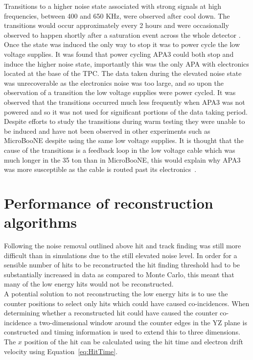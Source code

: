 Transitions to a higher noise state associated with strong signals at high frequencies, between 400 and 650 KHz, were observed after cool down. The transitions would occur approximately every 2 hours and were occasionally observed to happen shortly after a saturation event across the whole detector \citep{35tonNoiseMeeting}. Once the state was induced the only way to stop it was to power cycle the low voltage supplies. It was found that power cycling APA3 could both stop and induce the higher noise state, importantly this was the only APA with electronics located at the base of the TPC. The data taken during the elevated noise state was unrecoverable as the electronics noise was too large, and so upon the observation of a transition the low voltage supplies were power cycled. It was observed that the transitions occurred much less frequently when APA3 was not powered and so it was not used for significant portions of the data taking period. Despite efforts to study the transitions during warm testing they were unable to be induced and have not been observed in other experiments such as MicroBooNE despite using the same low voltage supplies. It is thought that the cause of the transitions is a feedback loop in the low voltage cable which was much longer in the 35 ton than in MicroBooNE, this would explain why APA3 was more susceptible as the cable is routed past its electronics~\citep{35tonNoiseDoc}.

\section{Performance of reconstruction algorithms} \label{sec:DataAlgs}  %
Following the noise removal outlined above hit and track finding was still more difficult than in simulations due to the still elevated noise level. In order for a sensible number of hits to be reconstructed the hit finding threshold had to be substantially increased in data as compared to Monte Carlo, this meant that many of the low energy hits would not be reconstructed. \\

A potential solution to not reconstructing the low energy hits is to use the counter positions to select only hits which could have caused co-incidences. When determining whether a reconstructed hit could have caused the counter co-incidence a two-dimensional window around the counter edges in the YZ plane is constructed and timing information is used to extend this to three dimensions.  The $x$ position of the hit can be calculated using the hit time and electron drift velocity using Equation~\ref{eq:HitTime}. \\

